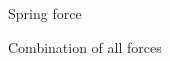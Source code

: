 \documentclass[11pt,a4paper]{scrartcl}
\begin{document}
\begin{figure}[htbp]
\centering
{}
\caption{Spring force}
\end{figure}

\begin{figure}[htbp]
\centering
{}
\caption{Combination of all forces}
\end{figure}
\end{document}
